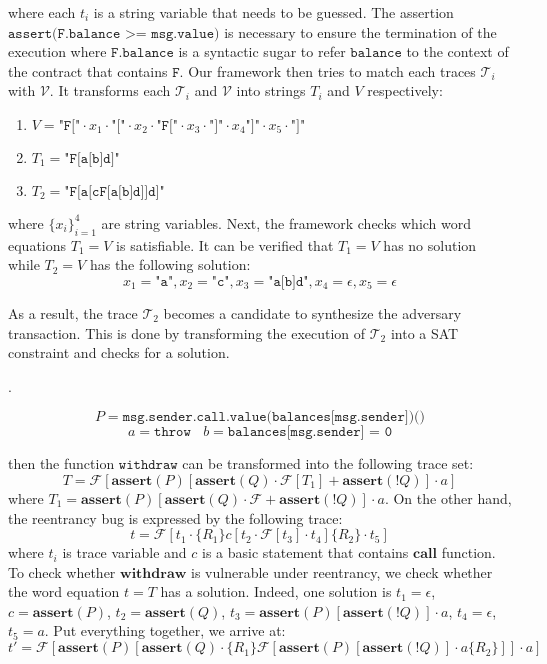 \documentclass[runningheads]{llncs}
\newcommand{\code}[1]{\texttt{#1}}
\begin{document}
where each $t_i$ is a string variable that needs to be guessed. The assertion $\code{assert(F.balance >= msg.value)}$ is necessary to ensure the termination of the execution where $\code{F.balance}$ is a syntactic sugar to refer $\code{balance}$ to the context of the contract that contains $\code{F}$. Our framework then tries to match each traces $\mathcal{T}_i$ with $\mathcal{V}$. It transforms each $\mathcal{T}_i$ and $\mathcal{V}$ into strings $T_i$ and $V$ respectively:
\begin{enumerate}
	\item $V = \code{"F["} \cdot x_1 \cdot \code{"["} \cdot x_2 \cdot \code{"F["} \cdot x_3 \cdot \code{"]"} \cdot x_4 \code{"]"} \cdot x_5 \cdot  \code{"]"}$
	\item $T_1 = \code{"F[a[b]d]"}$
	\item $T_2 = \code{"F[a[cF[a[b]d]]d]"}$
\end{enumerate}
where $\{x_i\}_{i=1}^4$ are string variables. Next, the framework checks which word equations $T_1 = V$ is satisfiable. It can be verified that $T_1 = V$ has no solution while $T_2 = V$ has the following solution:
$$
x_1 = \code{"a"}, x_2 =  \code{"c"}, x_3 = \code{"a[b]d"}, x_4 = \epsilon, x_5 = \epsilon
$$

As a result, the trace $\mathcal{T}_2$ becomes a candidate to synthesize the adversary transaction. This is done by transforming the execution of $\mathcal{T}_2$ into a SAT constraint and checks for a solution.

.

$$P = \texttt{msg.sender.call.value(balances[msg.sender])()}$$
$$
a = \texttt{throw}~~~~b = \texttt{balances[msg.sender] = 0}
$$

then the function $\texttt{withdraw}$ can be transformed into the following trace set:
$$
T = \mathcal{F}[\textbf{assert}(P)[\textbf{assert}(Q) \cdot \mathcal{F}[T_1]+\textbf{assert}(!Q)] \cdot a]
$$
where $T_1 = \textbf{assert}(P)[\textbf{assert}(Q) \cdot \mathcal{F}+\textbf{assert}(!Q)] \cdot a$. On the other hand, the reentrancy bug is expressed by the following trace:
$$
t = \mathcal{F}[t_1 \cdot \{R_1\}c[t_2 \cdot \mathcal{F}[t_3] \cdot t_4]\{R_2\} \cdot t_5]
$$
where  $t_i$ is trace variable and  $c$ is a basic statement that contains $\textbf{call}$ function. To check whether $\textbf{withdraw}$ is vulnerable under reentrancy, we check whether the word equation $t = T$ has a solution. Indeed, one solution is $t_1 = \epsilon$, $c = \textbf{assert}(P)$, $t_2 = \textbf{assert}(Q)$, $t_3 = \textbf{assert}(P)[\textbf{assert}(!Q)] \cdot a$, $t_4 = \epsilon$, $t_5 = a$. Put everything together, we arrive at:
$$
t' = \mathcal{F}[\textbf{assert}(P)[\textbf{assert}(Q) \cdot \{R_1\}\mathcal{F}[\textbf{assert}(P)[\textbf{assert}(!Q)] \cdot a\{R_2\}]] \cdot a]
$$
\end{document}

